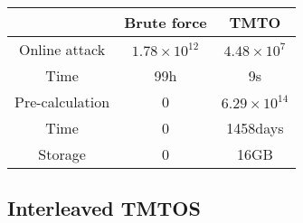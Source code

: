 \begin{center}
\begin{tabular}{|c|c|c|}
    \hline
    & Brute force & TMTO \\
    \hline
    Online attack & $1.78 \times 10^{12}$ &  $4.48 \times 10^7$\\
    Time & 99h & 9s\\
    \hline
    Pre-calculation & 0 & $6.29 \times 10^{14}$\\
    Time & 0 & 1458days \\
    Storage & 0 & 16GB \\
    \hline
\end{tabular}
\end{center}

\subsection{Interleaved TMTOS}


